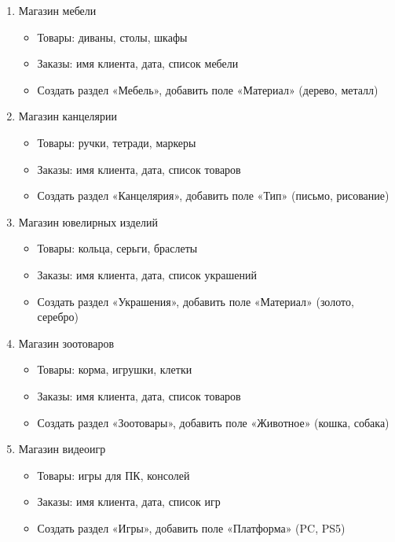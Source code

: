 \documentclass[12pt]{article}
\begin{document}
\begin{enumerate}
	\item Магазин мебели
	      \begin{itemize}
		      \item Товары: диваны, столы, шкафы
		      \item Заказы: имя клиента, дата, список мебели
		      \item Создать раздел «Мебель», добавить поле «Материал» (дерево, металл)
	      \end{itemize}

	\item Магазин канцелярии
	      \begin{itemize}
		      \item Товары: ручки, тетради, маркеры
		      \item Заказы: имя клиента, дата, список товаров
		      \item Создать раздел «Канцелярия», добавить поле «Тип» (письмо, рисование)
	      \end{itemize}

	\item Магазин ювелирных изделий
	      \begin{itemize}
		      \item Товары: кольца, серьги, браслеты
		      \item Заказы: имя клиента, дата, список украшений
		      \item Создать раздел «Украшения», добавить поле «Материал» (золото, серебро)
	      \end{itemize}

	      \newpage

	\item Магазин зоотоваров
	      \begin{itemize}
		      \item Товары: корма, игрушки, клетки
		      \item Заказы: имя клиента, дата, список товаров
		      \item Создать раздел «Зоотовары», добавить поле «Животное» (кошка, собака)
	      \end{itemize}

	\item Магазин видеоигр
	      \begin{itemize}
		      \item Товары: игры для ПК, консолей
		      \item Заказы: имя клиента, дата, список игр
		      \item Создать раздел «Игры», добавить поле «Платформа» (PC, PS5)
	      \end{itemize}


\end{enumerate}
\end{document}
